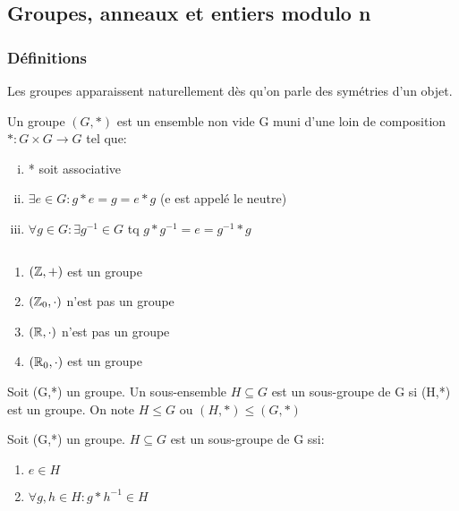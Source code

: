 \subsection{Groupes, anneaux et entiers modulo n}

\subsubsection{Définitions}

Les groupes apparaissent naturellement dès qu'on parle des symétries d'un objet. 

\begin{defn}
Un groupe $(G,*)$ est un ensemble non vide G muni d'une loin de composition $* : G \times G \rightarrow G$ tel que:

\begin{enumerate}[(i)]
\item * soit associative
\item $\exists e \in G: g*e = g = e*g$ (e est appelé le neutre)
\item $\forall g \in G: \exists g^{-1} \in G$ tq $g*g^{-1} = e = g^{-1}*g$
\end{enumerate}
\end{defn}

\begin{exmp} $\;$
	\begin{enumerate}
	\item $(\mathbb{Z},+)$ est un groupe
	\item $(\mathbb{Z}_0,\cdot)$ n'est pas un groupe
	\item $(\mathbb{R},\cdot)$ n'est pas un groupe
	\item $(\mathbb{R}_0,\cdot)$ est un groupe
	\end{enumerate}
\end{exmp}

\begin{defn}
Soit (G,*) un groupe. Un sous-ensemble $H \subseteq G$ est un sous-groupe de G si (H,*) est un groupe. On note $H \leq G$ ou $(H,*) \leq (G,*)$
\end{defn}

\newpage

\begin{prop}
Soit (G,*) un groupe. $H \subseteq G$ est un sous-groupe de G ssi:
	\begin{enumerate}
	\item $e \in H$
	\item $\forall g,h \in H: g*h^{-1} \in H$
	\end{enumerate} 
\end{prop}

